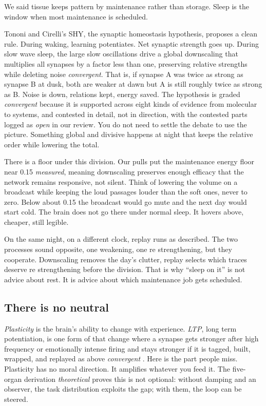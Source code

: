 We said tissue keeps pattern by maintenance rather than storage. Sleep is the window when most maintenance is scheduled.

Tononi and Cirelli's SHY, the synaptic homeostasis hypothesis, proposes a clean rule. During waking, learning potentiates. Net synaptic strength goes up. During slow wave sleep, the large slow oscillations drive a global downscaling that multiplies all synapses by a factor less than one, preserving relative strengths while deleting noise \textit{convergent}. That is, if synapse A was twice as strong as synapse B at dusk, both are weaker at dawn but A is still roughly twice as strong as B. Noise is down, relations kept, energy saved. The hypothesis is graded \textit{convergent} because it is supported across eight kinds of evidence from molecular to systems, and contested in detail, not in direction, with the contested parts logged as \textit{open} in our review. You do not need to settle the debate to use the picture. Something global and divisive happens at night that keeps the relative order while lowering the total.

There is a floor under this division. Our pulls put the maintenance energy floor near 0.15 \textit{measured}, meaning downscaling preserves enough efficacy that the network remains responsive, not silent. Think of lowering the volume on a broadcast while keeping the loud passages louder than the soft ones, never to zero. Below about 0.15 the broadcast would go mute and the next day would start cold. The brain does not go there under normal sleep. It hovers above, cheaper, still legible.

On the same night, on a different clock, replay runs as described. The two processes sound opposite, one weakening, one re strengthening, but they cooperate. Downscaling removes the day's clutter, replay selects which traces deserve re strengthening before the division. That is why ``sleep on it'' is not advice about rest. It is advice about which maintenance job gets scheduled.

\subsection*{There is no neutral}

\textit{Plasticity} is the brain's ability to change with experience. \textit{LTP}, long term potentiation, is one form of that change where a synapse gets stronger after high frequency or emotionally intense firing and stays stronger if it is tagged, built, wrapped, and replayed as above \textit{convergent} \citep{kandel2000}. Here is the part people miss. Plasticity has no moral direction. It amplifies whatever you feed it. The five-organ derivation \textit{theoretical} \citep{nayebi2026} proves this is not optional: without damping and an observer, the task distribution exploits the gap; with them, the loop can be steered.


